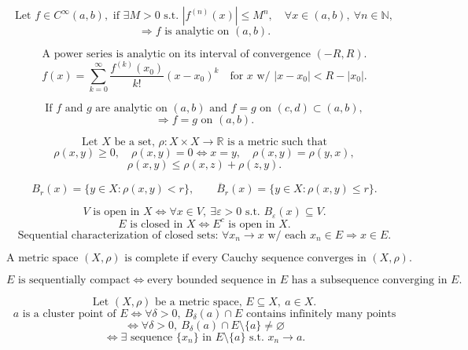 \documentclass[11pt]{article}
\begin{document}
\[
\text{Let }f\in C^\infty(a,b),\text{ if }\exists M>0
\text{ s.t. }|f^{(n)}(x)|\le M^n,\quad \forall x\in(a,b),\ \forall n\in\mathbb N,
\]
\[
\Longrightarrow
f\text{ is analytic on }(a,b).
\]

\[
\text{A power series is analytic on its interval of convergence }(-R,R).
\]
\[
f(x)=\sum_{k=0}^{\infty}\frac{f^{(k)}(x_0)}{k!}(x-x_0)^k
\quad\text{for }x\text{ w/ }|x-x_0|<R-|x_0|.
\]

\[
\text{If }f\text{ and }g\text{ are analytic on }(a,b)
\text{ and }f=g\text{ on }(c,d)\subset(a,b),
\]
\[
\Longrightarrow f=g\text{ on }(a,b).
\]

\newpage


\[
\text{Let }X\text{ be a set, }\rho:X\times X\to\mathbb R
\text{ is a metric such that}
\]
\[
\rho(x,y)\ge0,\quad
\rho(x,y)=0\Longleftrightarrow x=y,\quad
\rho(x,y)=\rho(y,x),
\]
\[
\rho(x,y)\le\rho(x,z)+\rho(z,y).
\]

\[
B_r(x)=\{y\in X:\rho(x,y)<r\},\qquad
\overline B_r(x)=\{y\in X:\rho(x,y)\le r\}.
\]

\[
V\text{ is open in }X
\Longleftrightarrow
\forall x\in V,\ \exists\varepsilon>0\text{ s.t. }B_\varepsilon(x)\subseteq V.
\]
\[
E\text{ is closed in }X
\Longleftrightarrow
E^c\text{ is open in }X.
\]
\[
\text{Sequential characterization of closed sets: }
\forall x_n\to x\text{ w/ each }x_n\in E\Longrightarrow x\in E.
\]

\[
\text{A metric space }(X,\rho)\text{ is complete if every Cauchy sequence converges in }(X,\rho).
\]

\[
E\text{ is sequentially compact}
\Longleftrightarrow
\text{every bounded sequence in }E\text{ has a subsequence converging in }E.
\]


\[
\text{Let }(X,\rho)\text{ be a metric space, }E\subseteq X,\ a\in X.
\]
\[
a\text{ is a cluster point of }E
\Longleftrightarrow
\forall\delta>0,\ B_\delta(a)\cap E
\text{ contains infinitely many points}
\]
\[
\Longleftrightarrow
\forall\delta>0,\ B_\delta(a)\cap E\setminus\{a\}\ne\varnothing
\]
\[
\Longleftrightarrow
\exists\text{ sequence }\{x_n\}\text{ in }E\setminus\{a\}
\text{ s.t. }x_n\to a.
\]
\end{document}
